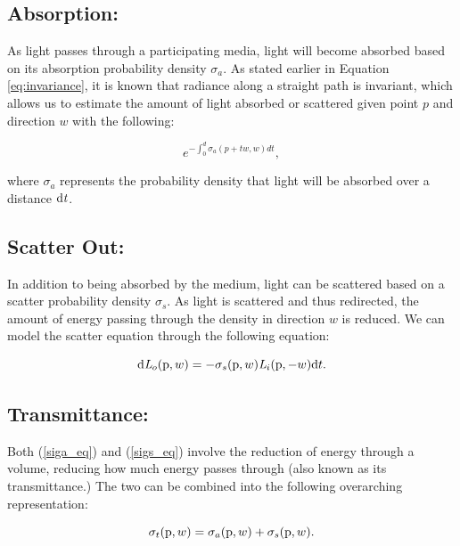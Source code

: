 \documentclass[12pt]{ucthesis}
\begin{document}
\subsection{Absorption:}
As light passes through a participating media, light will become absorbed based on its absorption probability density $\sigma_{a}$. As stated earlier in Equation \ref{eq:invariance}, it is known that radiance along a straight path is invariant, which allows us to estimate the amount of light absorbed or scattered given point $p$ and direction $w$ with the following:

\begin{equation}
e^{-\int_{0}^{d}\sigma_{a} (p+t\mathit{w},\mathit{w})d\mathit{t}},
\label{siga_eq}
\end{equation}

where $\sigma_{a}$ represents the probability density that light will be absorbed over a distance $\textup{d}\mathit{t}$.

\subsection{Scatter Out:}
In addition to being absorbed by the medium, light can be scattered based on a scatter probability density $\sigma_{s}$.  As light is scattered and thus redirected, the amount of energy passing through the density in direction $w$ is reduced.  We can model the scatter equation through the following equation:

\begin{equation}
\textup{d}\mathit{L}_{o}(\textup{p},w) = -\sigma_{s}(\textup{p},w) \mathit{L}_{i}(\textup{p},-w)\textup{d}t.
\label{sigs_eq}
\end{equation}

\subsection{Transmittance:}
Both (\ref{siga_eq}) and (\ref{sigs_eq}) involve the reduction of energy through a volume, reducing how much energy passes through (also known as its transmittance.)  The two can be combined into the following overarching representation:

\begin{equation}
\sigma_{t}(\textup{p},w) = \sigma_{a}(\textup{p},w) + \sigma_{s}(\textup{p}, w).
\label{sigt_eq}
\end{equation}
\end{document}
